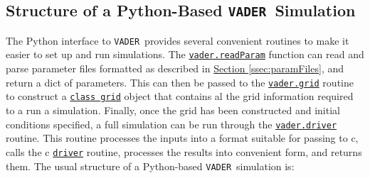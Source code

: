 \documentclass[12pt]{article}
\newcommand{\vader}{\texttt{VADER}}
\begin{document}
\subsection{Structure of a Python-Based \vader\ Simulation}

The Python interface to \vader\ provides several convenient routines to make it easier to set up and run simulations. The \hyperref[sssec:vader.readParam]{\texttt{vader.readParam}} function can read and parse parameter files formatted as described in \hyperref[ssec:paramFiles]{Section \ref{ssec:paramFiles}}, and return a dict of parameters. This can then be passed to the \hyperref[sssec:vader.grid]{\texttt{vader.grid}} routine to construct a \hyperref[sssec:vader.grid]{\texttt{class grid}} object that contains al the grid information required to a run a simulation. Finally, once the grid has been constructed and initial conditions specified, a full simulation can be run through the \hyperref[sssec:vader.driver]{\texttt{vader.driver}} routine. This routine processes the inputs into a format suitable for passing to c, calls the c \hyperref[sssec:driver]{\texttt{driver}} routine, processes the results into convenient form, and returns them. The usual structure of a Python-based \vader\ simulation is:
\end{document}
